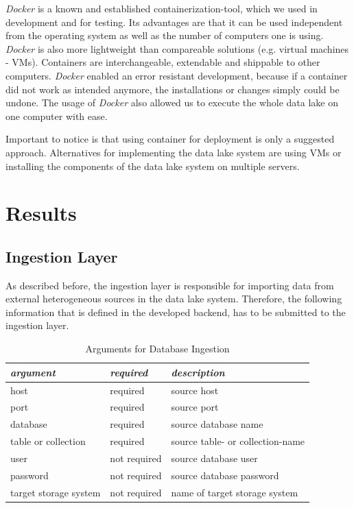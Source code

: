\documentclass[conference]{IEEEtran}
\begin{document}
\textit{Docker} is a known and established containerization-tool, which we used in 
development and for testing.
Its advantages are that it can be used independent from the operating system as well as the 
number of computers one is using.
\textit{Docker} is also more lightweight than compareable solutions (e.g. virtual machines - VMs).
Containers are interchangeable, extendable and shippable to other computers.
\textit{Docker} enabled an error resistant development, because if a container did not work as 
intended anymore, the installations or changes simply could be undone.
The usage of \textit{Docker} also allowed us to execute the whole data lake on one computer with 
ease.

Important to notice is that using container for deployment is only a suggested approach.
Alternatives for implementing the data lake system are using VMs or installing the 
components of the data lake system on multiple servers.

\section{Results}\label{RES}

\subsection{Ingestion Layer}\label{INL}

As described before, the ingestion layer is responsible for importing data from external 
heterogeneous sources in the data lake system. 
Therefore, the following information that is defined in the developed backend, has to be submitted 
to the ingestion layer.

\begin{table}[htbp]
\begin{center}
\begin{tabular}{|l|l|l|}
\cline{1-3} 
\textbf{\textit{argument}}& \textbf{\textit{required}}& \textbf{\textit{description}} \\
\hline
host & required & source host  \\
\hline
port & required & source port  \\
\hline
database & required & source database name \\
\hline
table or collection & required & source table- or collection-name\\
\hline
user & not required & source database user  \\
\hline
password & not required & source database password  \\
\hline
target storage system & not required & name of target storage system  \\
\hline
\end{tabular}
\label{TAB_DBI}
\end{center}
\caption{Arguments for Database Ingestion}
\end{table}
\end{document}
